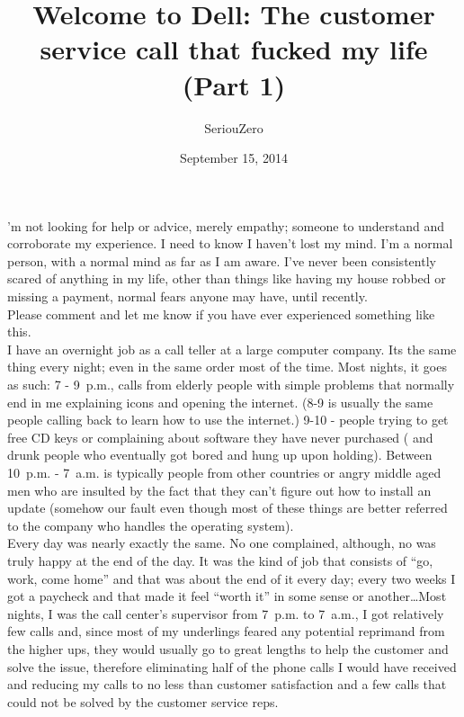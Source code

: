 \documentclass[a5paper]{scrartcl}
\title{Welcome to Dell: The customer service call that fucked my life (Part 1)}
\author{SeriouZero}
\date{September 15, 2014}
\begin{document}
\maketitle

'm not looking for help or advice, merely empathy; someone to understand and corroborate my experience. I need to know I haven't lost my mind. I'm a normal person, with a normal mind as far as I am aware. I've never been consistently scared of anything in my life, other than things like having my house robbed or missing a payment, normal fears anyone may have, until recently. \\


Please comment and let me know if you have ever experienced something like this.\\


I have an overnight job as a call teller at a large computer company. Its the same thing every night; even in the same order most of the time. Most nights, it goes as such: 7 - 9~p.m., calls from elderly people with simple problems that normally end in me explaining icons and opening the internet. (8-9 is usually the same people calling back to learn how to use the internet.) 9-10 - people trying to get free CD keys or complaining about software they have never purchased ( and drunk people who eventually got bored and hung up upon holding). Between 10~p.m. - 7~a.m. is typically people from other countries or angry middle aged men who are insulted by the fact that they can't figure out how to install an update (somehow our fault even though most of these things are better referred to the company who handles the operating system). \\


Every day was nearly exactly the same. No one complained, although, no was truly happy at the end of the day. It was the kind of job that consists of \enquote{go, work, come home} and that was about the end of it every day; every two weeks I got a paycheck and that made it feel \enquote{worth it} in some sense or another\dots Most nights, I was the call center's supervisor from 7~p.m. to 7~a.m., I got relatively few calls and, since most of my underlings feared any potential reprimand from the higher ups, they would usually go to great lengths to help the customer and solve the issue, therefore eliminating half of the phone calls I would have received and reducing my calls to no less than customer satisfaction and a few calls that could not be solved by the customer service reps. \\
\end{document}
